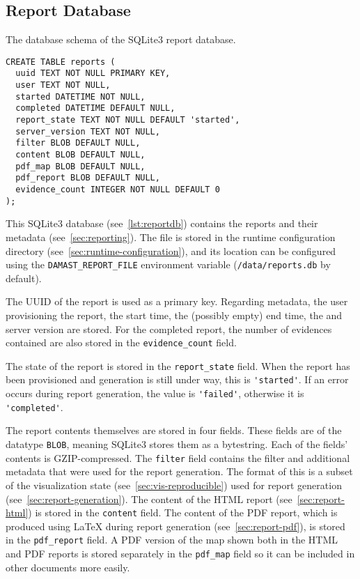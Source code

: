 \subsection{Report Database}
\label{sec:report-database}

\begin{lstfloat}
  \centering
  \caption{The database schema of the SQLite3 report database.}
  \label{lst:reportdb}

  \begin{lstlisting}
CREATE TABLE reports (
  uuid TEXT NOT NULL PRIMARY KEY,
  user TEXT NOT NULL,
  started DATETIME NOT NULL,
  completed DATETIME DEFAULT NULL,
  report_state TEXT NOT NULL DEFAULT 'started',
  server_version TEXT NOT NULL,
  filter BLOB DEFAULT NULL,
  content BLOB DEFAULT NULL,
  pdf_map BLOB DEFAULT NULL,
  pdf_report BLOB DEFAULT NULL,
  evidence_count INTEGER NOT NULL DEFAULT 0
);
  \end{lstlisting}
\end{lstfloat}

This SQLite3 database (see~\cref{lst:reportdb}) contains the reports and their metadata (see~\cref{sec:reporting}).
The file is stored in the runtime configuration directory (see~\cref{sec:runtime-configuration}), and its location can be configured using the \verb!DAMAST_REPORT_FILE! environment variable (\verb!/data/reports.db! by default).

The UUID of the report is used as a primary key.
Regarding metadata, the user provisioning the report, the start time, the (possibly empty) end time, the and server version are stored.
For the completed report, the number of evidences contained are also stored in the \verb!evidence_count! field.

The state of the report is stored in the \verb!report_state! field.
When the report has been provisioned and generation is still under way, this is \verb!'started'!.
If an error occurs during report generation, the value is \verb!'failed'!, otherwise it is \verb!'completed'!.

The report contents themselves are stored in four fields.
These fields are of the datatype \verb!BLOB!, meaning SQLite3 stores them as a bytestring.
Each of the fields' contents is GZIP-compressed.
The \verb!filter! field contains the filter and additional metadata that were used for the report generation.
The format of this is a subset of the visualization state (see~\cref{sec:vis-reproducible}) used for report generation (see~\cref{sec:report-generation}).
The content of the HTML report (see~\cref{sec:report-html}) is stored in the \verb!content! field.
The content of the PDF report, which is produced using \LaTeX{} during report generation (see~\cref{sec:report-pdf}), is stored in the \verb!pdf_report! field.
A PDF version of the map shown both in the HTML and PDF reports is stored separately in the \verb!pdf_map! field so it can be included in other documents more easily.


